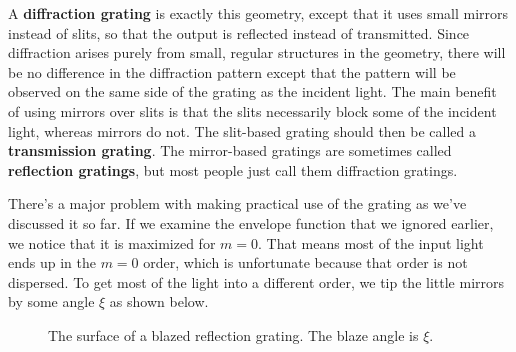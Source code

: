 \documentclass[]{manual}
\begin{document}
    A \textbf{diffraction grating} is exactly this geometry, except that it uses small mirrors instead of slits, so that the output is reflected instead of transmitted.
    Since diffraction arises purely from small, regular structures in the geometry, there will be no difference in the diffraction pattern except that the pattern will be observed on the same side of the grating as the incident light.
    The main benefit of using mirrors over slits is that the slits necessarily block some of the incident light, whereas mirrors do not.
    The slit-based grating should then be called a \textbf{transmission grating}.
    The mirror-based gratings are sometimes called \textbf{reflection gratings}, but most people just call them diffraction gratings.

    There's a major problem with making practical use of the grating as we've discussed it so far.
    If we examine the envelope function that we ignored earlier, we notice that it is maximized for $m=0$.
    That means most of the input light ends up in the $m=0$ order, which is unfortunate because that order is not dispersed.
    To get most of the light into a different order, we tip the little mirrors by some angle $\xi$ as shown below.

    \begin{figure}[H]
        \centering


        \caption[Blazed Grating]{
            The surface of a blazed reflection grating.
            The blaze angle is $\xi$.
        }
        \label{fig:blazed-grating}
    \end{figure}
\end{document}

